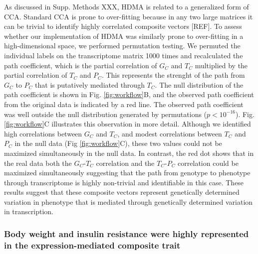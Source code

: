 \documentclass[
]{article}
\begin{document}
As discussed in Supp. Methods XXX, HDMA is related to a generalized form
of CCA. Standard CCA is prone to over-fitting because in any two large
matrices it can be trivial to identify highly correlated composite
vectors {[}REF{]}. To assess whether our implementation of HDMA was
similarly prone to over-fitting in a high-dimensional space, we
performed permutation testing. We permuted the individual labels on the
transcriptome matrix 1000 times and recalculated the path coefficient,
which is the partial correlation of \(G_C\) and \(T_C\) multiplied by
the partial correlation of \(T_C\) and \(P_C\). This represents the
strenght of the path from \(G_C\) to \(P_C\) that is putatively mediated
through \(T_C\). The null distribution of the path coefficient is shown
in Fig. \ref{fig:workflow}B, and the observed path coefficient from the
original data is indicated by a red line. The observed path coefficient
was well outside the null distribution generated by permutations
(\(p < 10^{-16}\)). Fig. \ref{fig:workflow}C illustrates this
observation in more detail. Although we identified high correlations
between \(G_C\) and \(T_C\), and modest correlations between \(T_C\) and
\(P_C\) in the null data (Fig \ref{fig:workflow}C), these two values
could not be maximized simultaneously in the null data. In contrast, the
red dot shows that in the real data both the \(G_C\)-\(T_C\) correlation
and the \(T_C\)-\(P_C\) correlation could be maximized simultaneously
suggesting that the path from genotype to phenotype through
transcriptome is highly non-trivial and identifiable in this case. These
results suggest that these composite vectors represent genetically
determined variation in phenotype that is mediated through genetically
determined variation in transcription.

\subsubsection{Body weight and insulin resistance were highly
represented in the expression-mediated composite
trait}\label{body-weight-and-insulin-resistance-were-highly-represented-in-the-expression-mediated-composite-trait}
\end{document}
